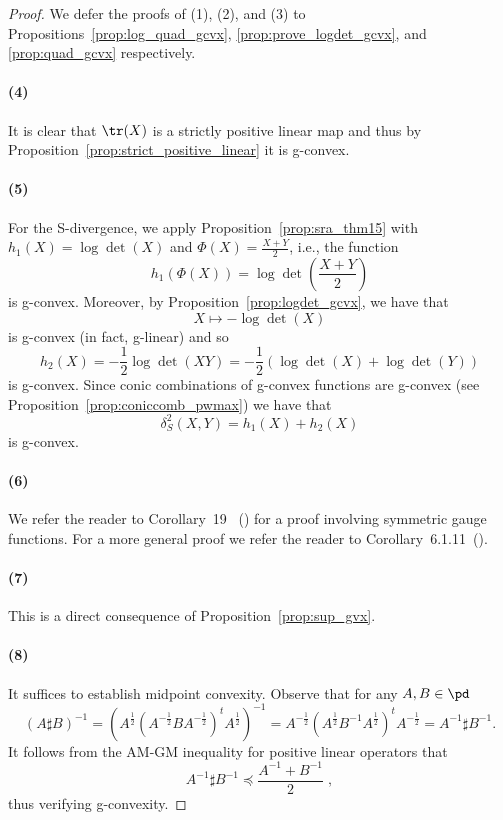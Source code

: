 \documentclass[twoside,11pt]{article}
\begin{document}
\begin{proof}
    We defer the proofs of (1), (2), and (3) to Propositions~\ref{prop:log_quad_gcvx}, \ref{prop:prove_logdet_gcvx}, and \ref{prop:quad_gcvx} respectively.
    \paragraph{(4)} It is clear that $\tr(X)$ is a strictly positive linear map and thus by Proposition~\ref{prop:strict_positive_linear} it is g-convex.
    \paragraph{(5)} For the S-divergence, we apply Proposition~\ref{prop:sra_thm15} with $h_1(X) = \log \det(X)$ and $\Phi(X) = \frac{X+Y}{2}$, i.e., the function 
    \[
    h_1(\Phi(X)) = \log \det \left(\frac{X+Y}{2}\right)
    \]
    is g-convex. Moreover, by Proposition~\ref{prop:logdet_gcvx}, we have that 
    \[
    X \mapsto -\log \det(X)
    \]
    is g-convex (in fact, g-linear) and so 
    \[
    h_2(X) = -\frac{1}{2}\log\det(XY) = - \frac{1}{2}\left(\log \det(X) + \log \det(Y)\right)
    \]
    is g-convex. Since conic combinations of g-convex functions are g-convex (see Proposition~\ref{prop:coniccomb_pwmax}) we have that
    \[
    \delta_S^2(X,Y) = h_1(X) + h_2(X) 
    \]
    is g-convex.
    \paragraph{(6)} We refer the reader to Corollary~19~ (\citep{sra2015conic}) for a proof involving symmetric gauge functions. For a more general proof we refer the reader to Corollary~6.1.11~(\citep{bhatia_psd}).
    \paragraph{(7)} This is a direct consequence of Proposition~\ref{prop:sup_gvx}.
    \paragraph{(8)} It suffices to establish midpoint convexity. Observe that for any $A,B \in \pd$ 
    \[
    \left(A \sharp B\right)^{-1} = \left( A^{\frac{1}{2}} \left(A^{-\frac{1}{2}} B A^{-\frac{1}{2}} \right)^t A^{\frac{1}{2}}  \right)^{-1} = A^{-\frac{1}{2}} \left(A^{\frac{1}{2}} B^{-1} A^{\frac{1}{2}} \right)^t A^{-\frac{1}{2}} = A^{-1} \sharp B^{-1}.
    \]
    It follows from the AM-GM inequality for positive linear operators that 
    \[
    A^{-1} \sharp B^{-1} \preceq \frac{A^{-1} + B^{-1}}{2} \; ,
    \]
    thus verifying g-convexity. 
\end{proof}
\end{document}
